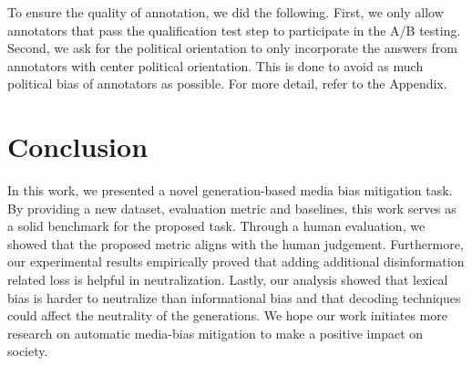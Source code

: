 \documentclass[11pt,a4paper]{article}
\begin{document}
To ensure the quality of annotation, we did the following. First, we only allow annotators that pass the qualification test step to participate in the A/B testing. Second, we ask for the political orientation to only incorporate the answers from annotators with center political orientation. This is done to avoid as much political bias of annotators as possible. 
For more detail, refer to the Appendix.

\section{Conclusion}
In this work, we presented a novel generation-based media bias mitigation task. By providing a new dataset, evaluation metric and baselines, this work serves as a solid benchmark for the proposed task. Through a human evaluation, we showed that the proposed metric aligns with the human judgement. Furthermore, our experimental results empirically proved that adding additional disinformation related loss is helpful in neutralization. Lastly, our analysis showed that lexical bias is harder to neutralize than informational bias and that decoding techniques could affect the neutrality of the generations. We hope our work initiates more research on automatic media-bias mitigation to make a positive impact on society.






\end{document}
